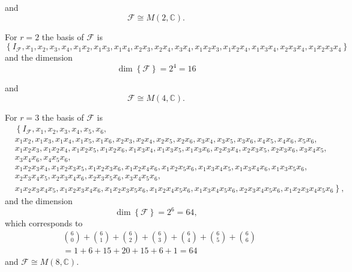 \documentclass[aps,preprint]{revtex4}%
\begin{document}
and
\begin{equation}
\mathcal{F}\cong M\left(  2,\mathbb{C}\right)  .
\end{equation}


For $r=2$ the basis of $\mathcal{F}$ is
\begin{equation}
\left\{  I_{\mathcal{F}},x_{1},x_{2},x_{3},x_{4},x_{1}x_{2},x_{1}x_{3}%
,x_{1}x_{4},x_{2}x_{3},x_{2}x_{4},x_{3}x_{4},x_{1}x_{2}x_{3},x_{1}x_{2}%
x_{4},x_{1}x_{3}x_{4},x_{2}x_{3}x_{4},x_{1}x_{2}x_{3}x_{4}\right\}
\end{equation}
and the dimension%
\begin{equation}
\dim\left\{  \mathcal{F}\right\}  =2^{4}=16
\end{equation}


and
\begin{equation}
\mathcal{F}\cong M\left(  4,\mathbb{C}\right)  .
\end{equation}


For $r=3$ the basis of $\mathcal{F}$ is
\begin{align}
&  \left\{  I_{\mathcal{F}},x_{1},x_{2},x_{3},x_{4},x_{5},x_{6},\right.
\nonumber\\
&  x_{1}x_{2},x_{1}x_{3},x_{1}x_{4},x_{1}x_{5},x_{1}x_{6},x_{2}x_{3}%
,x_{2}x_{4},x_{2}x_{5},x_{2}x_{6},x_{3}x_{4},x_{3}x_{5},x_{3}x_{6},x_{4}%
x_{5},x_{4}x_{6},x_{5}x_{6},\nonumber\\
&  x_{1}x_{2}x_{3},x_{1}x_{2}x_{4},x_{1}x_{2}x_{5},x_{1}x_{2}x_{6},x_{1}%
x_{3}x_{4},x_{1}x_{3}x_{5},x_{1}x_{3}x_{6},x_{2}x_{3}x_{4},x_{2}x_{3}%
x_{5},x_{2}x_{3}x_{6},x_{3}x_{4}x_{5},\nonumber\\
&  x_{3}x_{4}x_{6},x_{4}x_{5}x_{6},\nonumber\\
&  x_{1}x_{2}x_{3}x_{4},x_{1}x_{2}x_{3}x_{5},x_{1}x_{2}x_{3}x_{6},x_{1}%
x_{2}x_{4}x_{6},x_{1}x_{2}x_{5}x_{6},x_{1}x_{3}x_{4}x_{5},x_{1}x_{3}x_{4}%
x_{6},x_{1}x_{3}x_{5}x_{6},\nonumber\\
&  x_{2}x_{3}x_{4}x_{5},x_{2}x_{3}x_{4}x_{6},x_{2}x_{3}x_{5}x_{6},x_{3}%
x_{4}x_{5}x_{6},\nonumber\\
&  \left.  x_{1}x_{2}x_{3}x_{4}x_{5},x_{1}x_{2}x_{3}x_{4}x_{6},x_{1}x_{2}%
x_{3}x_{5}x_{6},x_{1}x_{2}x_{4}x_{5}x_{6},x_{1}x_{3}x_{4}x_{5}x_{6},x_{2}%
x_{3}x_{4}x_{5}x_{6},x_{1}x_{2}x_{3}x_{4}x_{5}x_{6}\right\}  ,
\end{align}
and the dimension%
\begin{equation}
\dim\left\{  \mathcal{F}\right\}  =2^{6}=64,
\end{equation}
which corresponds to
\begin{align}
&  \binom{6}{0}+\binom{6}{1}+\binom{6}{2}+\binom{6}{3}+\binom{6}{4}+\binom
{6}{5}+\binom{6}{6}\nonumber\\
&  =1+6+15+20+15+6+1=64
\end{align}
and $\mathcal{F}\cong M\left(  8,\mathbb{C}\right)  .$
\end{document}
